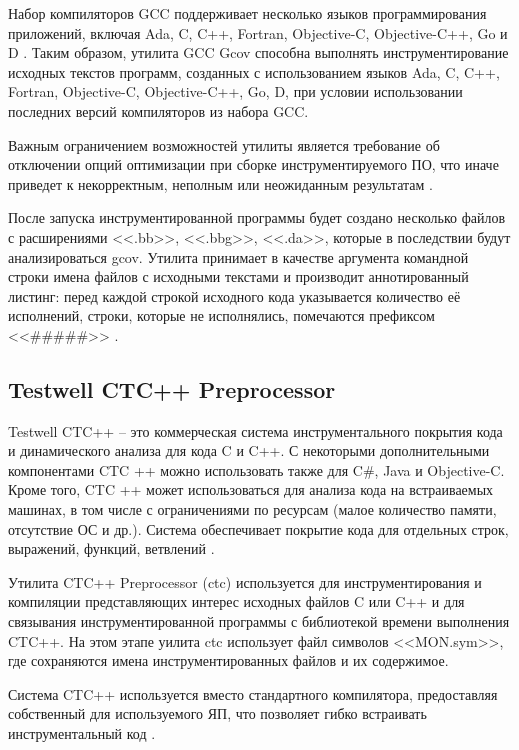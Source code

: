 Набор компиляторов GCC поддерживает несколько языков программирования приложений, включая Ada, C, C++, Fortran, Objective-C, Objective-C++, Go и D \cite{reviewGCC}. Таким образом, утилита GCC Gcov способна выполнять инструментирование исходных текстов программ, созданных с использованием языков Ada, C, C++, Fortran, Objective-C, Objective-C++, Go, D, при условии использовании последних версий компиляторов из набора GCC.

Важным ограничением возможностей утилиты является требование об отключении опций оптимизации при сборке инструментируемого ПО, что иначе приведет к некорректным, неполным или неожиданным результатам \cite{reviewGCCGcov}.

После запуска инструментированной программы будет создано несколько файлов с расширениями <<.bb>>, <<.bbg>>, <<.da>>, которые в последствии будут анализироваться gcov. Утилита принимает в качестве аргумента командной строки имена файлов с исходными текстами и производит аннотированный листинг: перед каждой строкой исходного кода указывается количество её исполнений, строки, которые не исполнялись, помечаются префиксом <<\#\#\#\#\#>> \cite{reviewGCCGcov}.

\subsection{Testwell CTC++ Preprocessor}
Testwell CTC++ -- это коммерческая система инструментального покрытия кода и динамического анализа для кода C и C++. С некоторыми дополнительными компонентами CTC ++ можно использовать также для C\#, Java и Objective-C. Кроме того, CTC ++ может использоваться для анализа кода на встраиваемых машинах, в том числе с ограничениями по ресурсам (малое количество памяти, отсутствие ОС и др.). Система обеспечивает покрытие кода для отдельных строк, выражений, функций, ветвлений \cite{reviewCTC}.

Утилита CTC++ Preprocessor (ctc) используется для инструментирования и компиляции представляющих интерес исходных файлов C или C++ и для связывания инструментированной программы с библиотекой времени выполнения CTC++. На этом этапе уилита ctc использует файл символов <<MON.sym>>, где сохраняются имена инструментированных файлов и их содержимое.

Система CTC++ используется вместо стандартного компилятора, предоставляя собственный для используемого ЯП, что позволяет гибко встраивать инструментальный код \cite{reviewCTC}.

